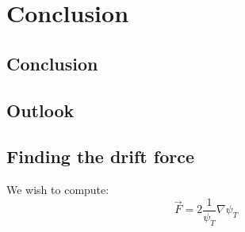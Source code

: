\documentclass[a4paper, 10pt]{article}
\begin{document}
	\section{Conclusion}
	
	\subsection{Conclusion}
	
	\subsection{Outlook}
	
	\begin{appendices}
		\section{Finding the drift force}
		We wish to compute:
		\begin{equation}
		\vec{F}=2\frac{1}{\psi_T}\nabla \psi_T
		\end{equation}

\end{appendices}
\end{document}
